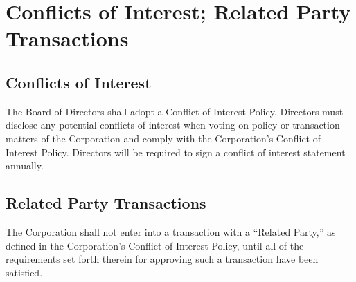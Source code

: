 \section{Conflicts of Interest; Related Party Transactions}

\subsection{Conflicts of Interest}
The Board of Directors shall adopt a Conflict of Interest
Policy. Directors must disclose any potential conflicts of interest
when voting on policy or transaction matters of the Corporation and
comply with the Corporation's Conflict of Interest Policy. Directors
will be required to sign a conflict of interest statement annually.

\subsection{Related Party Transactions}
The Corporation shall not enter into a transaction with a ``Related
Party,'' as defined in the Corporation's Conflict of Interest Policy,
until all of the requirements set forth therein for approving such a
transaction have been satisfied.

